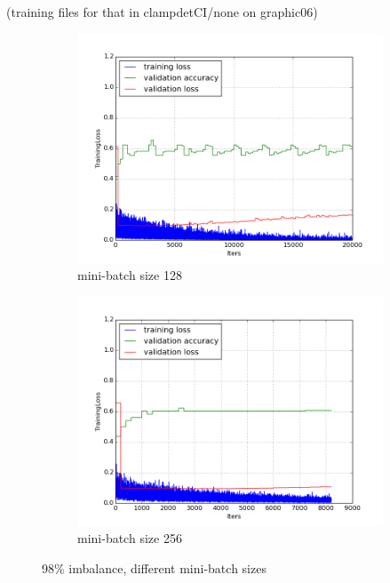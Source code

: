 \documentclass[a4paper,11pt]{article}
\begin{document}
(training files for that in clampdetCI/none on graphic06)


\begin{figure}
    \centering
    \begin{minipage}[b]{\textwidth}
      \begin{subfigure}{.5\textwidth} 
        \centering
        \includegraphics[scale=0.4]{images/plot_clampdetCI98_none_bs128_lr4.png}
        \caption{mini-batch size 128}\label{fig:2a}
      \end{subfigure}%
      \begin{subfigure}{.5\textwidth} 
        \centering
        \includegraphics[scale=0.4]{images/plot_clampdetCI98_none_bs256_lr4.png}
        \caption{mini-batch size 256}\label{fig:2b}
      \end{subfigure} \par \vspace*{20pt} %
      \caption{98\% imbalance, different mini-batch sizes}\label{fig:2}
    \end{minipage}%
\end{figure}
\end{document}
